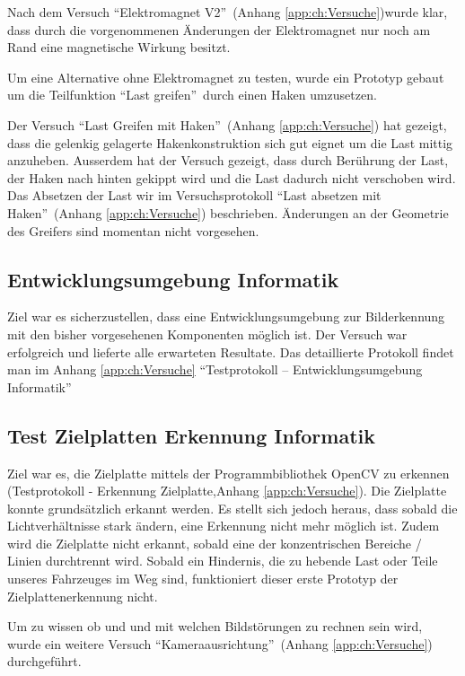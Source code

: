 \documentclass[a4paper]{report}
\begin{document}
Nach dem Versuch \textquotedblleft Elektromagnet V2\textquotedblright\ (Anhang \ref{app:ch:Versuche})wurde klar, dass durch die vorgenommenen Änderungen der Elektromagnet nur noch am Rand eine magnetische Wirkung besitzt.

Um eine Alternative ohne Elektromagnet zu testen, wurde ein Prototyp gebaut um die Teilfunktion \textquotedblleft Last greifen\textquotedblright\ durch einen Haken umzusetzen.

Der Versuch \textquotedblleft Last Greifen mit Haken\textquotedblright\ (Anhang \ref{app:ch:Versuche}) hat gezeigt, dass die gelenkig gelagerte Hakenkonstruktion sich gut eignet um die Last mittig anzuheben. Ausserdem hat der Versuch gezeigt, dass durch Berührung der Last, der Haken nach hinten gekippt wird und die Last dadurch nicht verschoben wird. Das Absetzen der Last wir im Versuchsprotokoll \textquotedblleft Last absetzen mit Haken\textquotedblright\ (Anhang \ref{app:ch:Versuche}) beschrieben. Änderungen an der Geometrie des Greifers sind momentan nicht vorgesehen.

\subsection{Entwicklungsumgebung Informatik}
\label{ssec:VersEntI}
Ziel war es sicherzustellen, dass eine Entwicklungsumgebung zur Bilderkennung mit den bisher vorgesehenen Komponenten möglich ist. Der Versuch war erfolgreich und lieferte alle erwarteten Resultate. Das detaillierte Protokoll findet man im Anhang \ref{app:ch:Versuche} \textquotedblleft Testprotokoll – Entwicklungsumgebung Informatik\textquotedblright

\subsection{Test Zielplatten Erkennung Informatik}
\label{ssec:ZielplattenErkennung}
Ziel war es, die Zielplatte mittels der Programmbibliothek OpenCV zu erkennen (Testprotokoll - Erkennung Zielplatte,Anhang \ref{app:ch:Versuche}).
Die Zielplatte konnte grundsätzlich erkannt werden. Es stellt sich jedoch heraus, dass sobald die Lichtverhältnisse stark ändern, eine Erkennung nicht mehr möglich ist. Zudem wird die Zielplatte nicht erkannt, sobald eine der konzentrischen Bereiche / Linien durchtrennt wird. Sobald ein Hindernis, die zu hebende Last oder Teile unseres Fahrzeuges im Weg sind, funktioniert dieser erste Prototyp der Zielplattenerkennung nicht.

Um zu wissen ob und und mit welchen Bildstörungen zu rechnen sein wird, wurde ein weitere Versuch \textquotedblleft Kameraausrichtung\textquotedblright\ (Anhang \ref{app:ch:Versuche}) durchgeführt.
\end{document}
